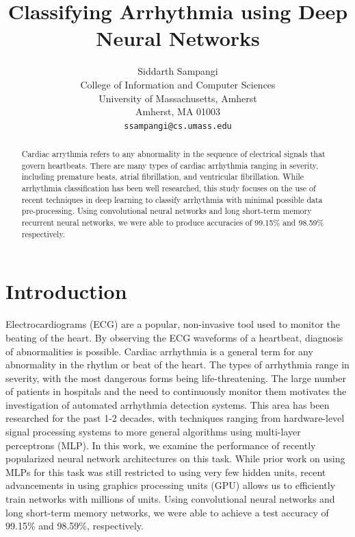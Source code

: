 \documentclass{article} %
\title{Classifying Arrhythmia using Deep Neural Networks}
\author{
Siddarth Sampangi \\
College of Information and Computer Sciences\\
University of Massachusetts, Amherst\\
Amherst, MA 01003 \\
\texttt{ssampangi@cs.umass.edu} \\
}
\begin{document}
\maketitle

\begin{abstract}
Cardiac arrythmia refers to any abnormality in the sequence of electrical signals that govern heartbeats. There are many types of cardiac arrhythmia ranging in severity, including premature beats, atrial fibrillation, and ventricular fibrillation. While arrhythmia classification has been well researched, this study focuses on the use of recent techniques in deep learning to classify arrhythmia with minimal possible data pre-processing. Using convolutional neural networks and long short-term memory recurrent neural networks, we were able to produce accuracies of 99.15\% and 98.59\% respectively.

\end{abstract}

\section{Introduction}
Electrocardiograms (ECG) are a popular, non-invasive tool used to monitor the beating of the heart. By observing the ECG waveforms of a heartbeat, diagnosis of abnormalities is possible. Cardiac arrhythmia is a general term for any abnormality in the rhythm or beat of the heart. The types of arrhythmia range in severity, with the most dangerous forms being life-threatening. The large number of patients in hospitals and the need to continuously monitor them motivates the investigation of automated arrhythmia detection systems. This area has been researched for the past 1-2 decades, with techniques ranging from hardware-level signal processing systems to more general algorithms using multi-layer perceptrons (MLP). In this work, we examine the performance of recently popularized neural network architectures on this task. While prior work on using MLPs for this task was still restricted to using very few hidden units, recent advancements in using graphics processing units (GPU) allows us to efficiently train networks with millions of units. Using convolutional neural networks and long short-term memory networks, we were able to achieve a test accuracy of 99.15\% and 98.59\%, respectively.
\end{document}

